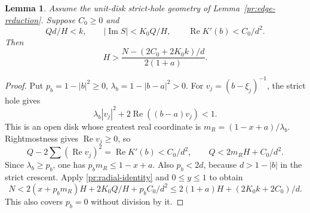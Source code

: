 \documentclass[11pt,reqno]{amsart}
\numberwithin{equation}{section}
\newtheorem{lemma}[theorem]{Lemma}
\theoremstyle{definition}
\theoremstyle{remark}
\renewcommand{\Re}{\operatorname{Re}}
\renewcommand{\Im}{\operatorname{Im}}
\begin{document}
\begin{lemma}\label{lt:hole-field}
Assume the unit-disk strict-hole geometry of
Lemma~\ref{pr:edge-reduction}. Suppose $C_0\ge0$ and
\[
 Qd/H<k,\qquad |\Im S|<K_0Q/H,\qquad
 \Re K'(b)<C_0/d^2.
\]
Then
\begin{equation}\label{lt:general-hole-field}
 H>\frac{N-(2C_0+2K_0k)/d}{2(1+a)}.
\end{equation}
\end{lemma}
\begin{proof}
Put $p_b=1-|b|^2\ge0$, $\lambda_b=1-|b-a|^2>0$.
For $v_j=(b-\xi_j)^{-1}$, the strict hole gives
\[
 \lambda_b|v_j|^2+2\Re((b-a)v_j)<1.
\]
This is an open disk whose greatest real coordinate is
$m_R=(1-x+a)/\lambda_b$. Rightmostness gives $\Re v_j\ge0$,
so
\[
 Q-2\sum(\Re v_j)^2=\Re K'(b)<C_0/d^2,\qquad
 Q<2m_RH+C_0/d^2.
\]
Since $\lambda_b\ge p_b$, one has $p_bm_R\le1-x+a$.
Also $p_b<2d$, because $d>1-|b|$ in the strict crescent.
Apply \eqref{pr:radial-identity} and $0\le y\le1$ to obtain
\[
 N<2(x+p_bm_R)H+2K_0Q/H+p_bC_0/d^2
   \le2(1+a)H+(2K_0k+2C_0)/d.
\]
This also covers $p_b=0$ without division by it.
\end{proof}
\end{document}
